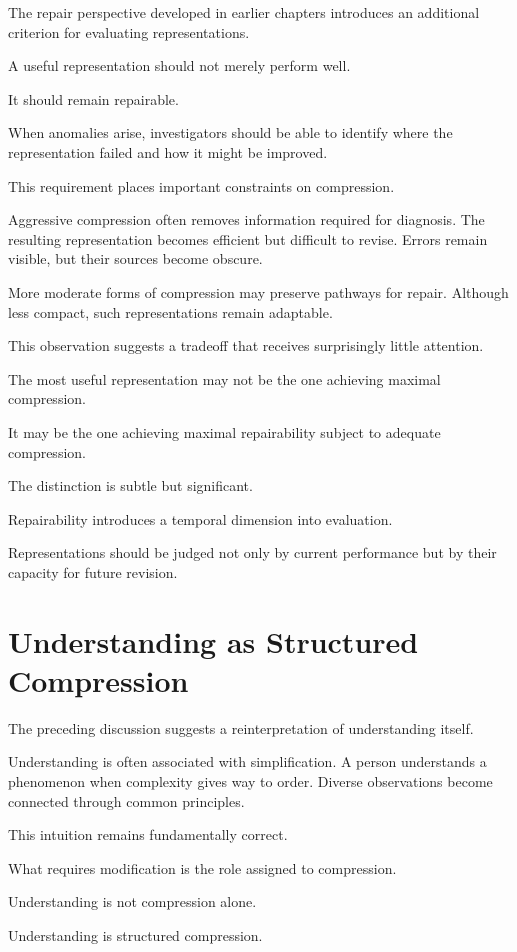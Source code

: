 \documentclass[11pt,oneside,openany]{book}
\begin{document}
The repair perspective developed in earlier chapters introduces an additional criterion for evaluating representations.

A useful representation should not merely perform well.

It should remain repairable.

When anomalies arise, investigators should be able to identify where the representation failed and how it might be improved.

This requirement places important constraints on compression.

Aggressive compression often removes information required for diagnosis. The resulting representation becomes efficient but difficult to revise. Errors remain visible, but their sources become obscure.

More moderate forms of compression may preserve pathways for repair. Although less compact, such representations remain adaptable.

This observation suggests a tradeoff that receives surprisingly little attention.

The most useful representation may not be the one achieving maximal compression.

It may be the one achieving maximal repairability subject to adequate compression.

The distinction is subtle but significant.

Repairability introduces a temporal dimension into evaluation.

Representations should be judged not only by current performance but by their capacity for future revision.

\section{Understanding as Structured Compression}

The preceding discussion suggests a reinterpretation of understanding itself.

Understanding is often associated with simplification. A person understands a phenomenon when complexity gives way to order. Diverse observations become connected through common principles.

This intuition remains fundamentally correct.

What requires modification is the role assigned to compression.

Understanding is not compression alone.

Understanding is structured compression.
\end{document}
